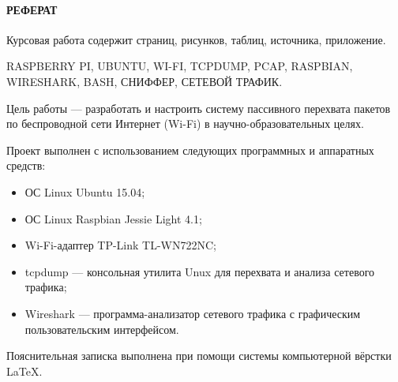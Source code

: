 \newpage
{}
\paragraph{\hfill РЕФЕРАТ \hfill}
Курсовая работа содержит  страниц,  рисунков,  таблиц,  источника,  приложение.

RASPBERRY PI, UBUNTU, WI-FI, TCPDUMP, PCAP, RASPBIAN, WIRESHARK, BASH, СНИФФЕР, СЕТЕВОЙ ТРАФИК.

Цель работы --- разработать и настроить систему пассивного перехвата пакетов по беспроводной сети Интернет (Wi-Fi) в научно-образовательных целях.

Проект выполнен с использованием следующих программных и аппаратных средств:
\begin{itemize}
  \item ОС Linux Ubuntu 15.04;
  \item ОС Linux Raspbian Jessie Light 4.1;
  \item Wi-Fi-адаптер TP-Link TL-WN722NC;
  \item tcpdump --- консольная утилита Unux для перехвата и анализа сетевого трафика;
  \item Wireshark --- программа-анализатор сетевого трафика с графическим пользовательским интерфейсом. 
\end{itemize}

Пояснительная записка выполнена при помощи системы компьютерной вёрстки \LaTeX.
